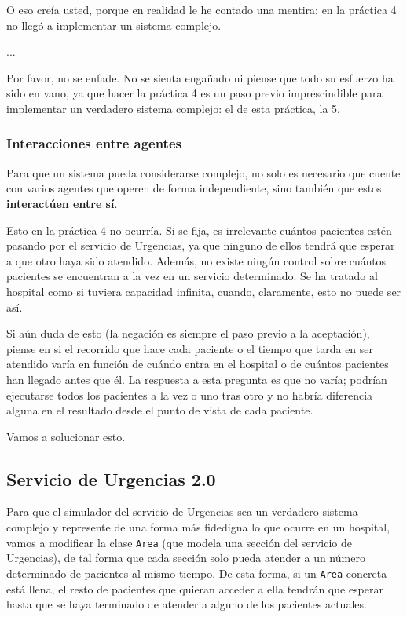 \documentclass[10pt,a4paper,spanish]{article}
\newcommand{\code}[1]{\texttt{#1}}
\begin{document}
O eso creía usted, porque en realidad le he contado una mentira: en la práctica 4 no llegó a implementar un sistema complejo.

\vspace{1cm}

...

\vspace{1cm}

Por favor, no se enfade. No se sienta engañado ni piense que todo su esfuerzo ha sido en vano, ya que hacer la práctica 4 es un paso previo imprescindible para implementar un verdadero sistema complejo: el de esta práctica, la 5.

\subsubsection{Interacciones entre agentes}

Para que un sistema pueda considerarse complejo, no solo es necesario que cuente con varios agentes que operen de forma independiente, sino también que estos \textbf{interactúen entre sí}.

Esto en la práctica 4 no ocurría. Si se fija, es irrelevante cuántos pacientes estén pasando por el servicio de Urgencias, ya que ninguno de ellos tendrá que esperar a que otro haya sido atendido. Además, no existe ningún control sobre cuántos pacientes se encuentran a la vez en un servicio determinado. Se ha tratado al hospital como si tuviera capacidad infinita, cuando, claramente, esto no puede ser así.

Si aún duda de esto (la negación es siempre el paso previo a la aceptación), piense en si el recorrido que hace cada paciente o el tiempo que tarda en ser atendido varía en función de cuándo entra en el hospital o de cuántos pacientes han llegado antes que él. La respuesta a esta pregunta es que no varía; podrían ejecutarse todos los pacientes a la vez o uno tras otro y no habría diferencia alguna en el resultado desde el punto de vista de cada paciente.

Vamos a solucionar esto.

\subsection{Servicio de Urgencias 2.0}

Para que el simulador del servicio de Urgencias sea un verdadero sistema complejo y represente de una forma más fidedigna lo que ocurre en un hospital, vamos a modificar la clase \code{Area} (que modela una sección del servicio de Urgencias), de tal forma que cada sección solo pueda atender a un número determinado de pacientes al mismo tiempo. De esta forma, si un \code{Area} concreta está llena, el resto de pacientes que quieran acceder a ella tendrán que esperar hasta que se haya terminado de atender a alguno de los pacientes actuales.
\end{document}
